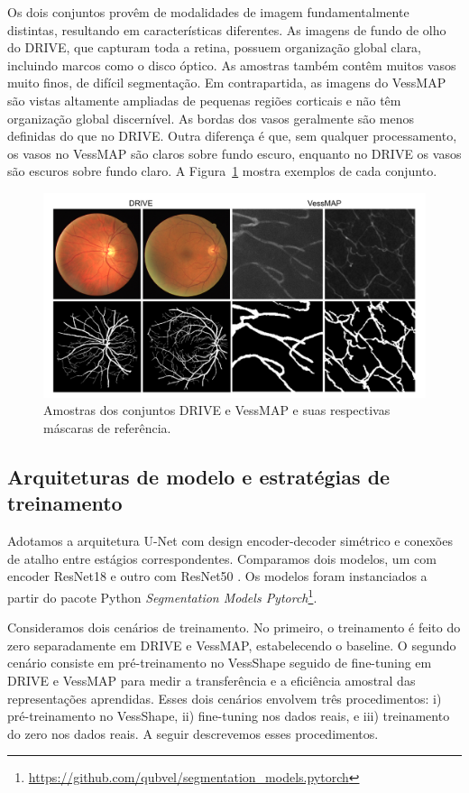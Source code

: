 \documentclass[%
reprint,
nofootinbib,
 amsmath,amssymb,
aps,
floatfix,
superscriptaddress,
showkeys,
longbibliography
]{revtex4-1}
\begin{document}
Os dois conjuntos provêm de modalidades de imagem fundamentalmente distintas, resultando em características diferentes. As imagens de fundo de olho do DRIVE, que capturam toda a retina, possuem organização global clara, incluindo marcos como o disco óptico. As amostras também contêm muitos vasos muito finos, de difícil segmentação. Em contrapartida, as imagens do VessMAP são vistas altamente ampliadas de pequenas regiões corticais e não têm organização global discernível. As bordas dos vasos geralmente são menos definidas do que no DRIVE. Outra diferença é que, sem qualquer processamento, os vasos no VessMAP são claros sobre fundo escuro, enquanto no DRIVE os vasos são escuros sobre fundo claro. A Figura~\ref{f:drive_vessmap_samples} mostra exemplos de cada conjunto.

\begin{figure}[tbp]
    \centering
    \includegraphics[width=\columnwidth]{figures/results/drive_vessmap_samples.pdf}
    \caption{Amostras dos conjuntos DRIVE e VessMAP e suas respectivas máscaras de referência.}
    \label{f:drive_vessmap_samples}
\end{figure}

\subsection{Arquiteturas de modelo e estratégias de treinamento}

Adotamos a arquitetura U-Net com design encoder-decoder simétrico e conexões de atalho entre estágios correspondentes. Comparamos dois modelos, um com encoder ResNet18 e outro com ResNet50 \cite{he2016deep}. Os modelos foram instanciados a partir do pacote Python \textit{Segmentation Models Pytorch}\footnote{\url{https://github.com/qubvel/segmentation_models.pytorch}}.

Consideramos dois cenários de treinamento. No primeiro, o treinamento é feito do zero separadamente em DRIVE e VessMAP, estabelecendo o baseline. O segundo cenário consiste em pré-treinamento no VessShape seguido de fine-tuning em DRIVE e VessMAP para medir a transferência e a eficiência amostral das representações aprendidas. Esses dois cenários envolvem três procedimentos: i) pré-treinamento no VessShape, ii) fine-tuning nos dados reais, e iii) treinamento do zero nos dados reais. A seguir descrevemos esses procedimentos.
\end{document}
